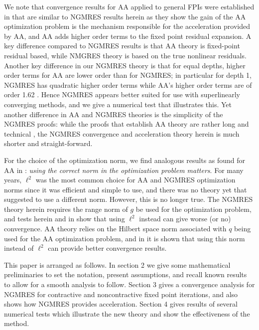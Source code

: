 \documentclass{article}
\numberwithin{equation}{section}
\begin{document}
We note that convergence results for AA applied to general FPIs were established in \cite{PR21,PR25} that 
are similar to NGMRES results herein as they show the gain of the AA optimization problem is the mechanism responsible for the acceleration provided by AA, and AA adds higher order terms to the fixed point residual expansion.  A key difference compared to NGMRES results is that AA theory is fixed-point residual based, while NMGRES theory is based on the true nonlinear residuals.  Another key difference in our NGMRES theory is that for equal depths, higher order terms for AA are lower order than for NGMRES; in particular for depth 1, NGMRES has quadratic higher order terms while AA's higher order terms are of order 1.62 \cite{RX23}.  Hence NGMRES appears better suited for use with superlinearly converging methods, and we give a numerical test that illustrates this.  Yet another difference in AA and NGMRES theories is the simplicity of the NGMRES proofs: while the proofs that establish AA theory are rather long and technical \cite{PR25,PR21,EPRX20,PRX19, X23, RX23}, the NGMRES convergence and acceleration theory herein is much shorter and straight-forward.

For the choice of the optimization norm, we find analogous results as found for AA in \cite{HR25}: {\it using the correct norm in the optimization problem matters}.  For many years,  $\ell^2$ was the most common choice for AA and NGMRES optimization norms since it was efficient and simple to use, and there was no theory yet that suggested to use a different norm.  However, this is no longer true.  The NGMRES theory herein requires the range norm of $g$ be used for the optimization problem, and tests herein and in \cite{HR26} show that using $\ell^2$ instead can give worse (or no) convergence. AA theory relies on the Hilbert space norm associated with $q$ being used for the AA optimization problem, and in \cite{HR25} it is shown that using this norm instead of $\ell^2$ can provide better convergence results.  

This paper is arranged as follows.  In section 2 we give some mathematical preliminaries to set the notation, present assumptions, and recall known results to allow for a smooth analysis to follow.  Section 3 gives a convergence analysis for NGMRES for contractive and noncontractive fixed point iterations, and also shows how NGMRES provides acceleration.  Section 4 gives results of several numerical tests which illustrate the new theory and show the effectiveness of the method.
\end{document}

